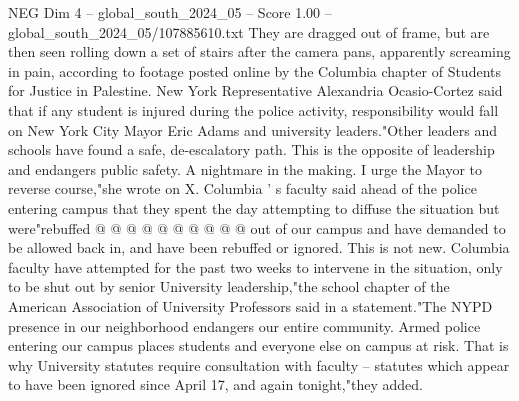 \begin{textsample}{NEG Dim 4 – global\_south\_2024\_05 – Score 1.00 – global\_south\_2024\_05/107885610.txt}
They are dragged out of frame, but are then seen rolling down a set of stairs after the camera pans, apparently screaming in pain, according to footage posted online by the Columbia chapter of Students for Justice in Palestine.
New York Representative Alexandria Ocasio-Cortez said that if any student is injured during the police activity, responsibility would fall on New York City Mayor Eric Adams and university leaders."Other leaders and schools have found a safe, de-escalatory path.
This is the opposite of leadership and endangers public safety.
A nightmare in the making.
I urge the Mayor to reverse course,"she wrote on X.
Columbia ' s faculty said ahead of the police entering campus that they spent the day attempting to diffuse the situation but were"rebuffed @ @ @ @ @ @ @ @ @ @ out of our campus and have demanded to be allowed back in, and have been rebuffed or ignored.
This is not new.
Columbia faculty have attempted for the past two weeks to intervene in the situation, only to be shut out by senior University leadership,"the school chapter of the American Association of University Professors said in a statement."The NYPD presence in our neighborhood endangers our entire community.
Armed police entering our campus places students and everyone else on campus at risk.
That is why University statutes require consultation with faculty -- statutes which appear to have been ignored since April 17, and again tonight,"they added.

\end{textsample}
